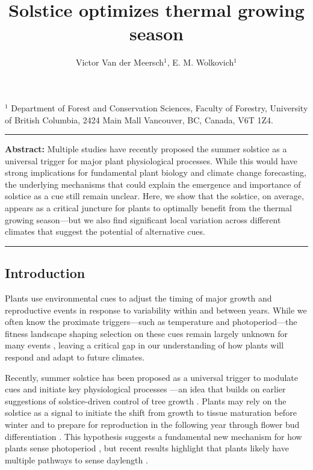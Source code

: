 \documentclass[11pt,letter]{article}
\begin{document}
\title{Solstice optimizes thermal growing season}

\author{Victor Van der Meersch$^{1}$, E. M. Wolkovich$^{1}$}
\date{}
\maketitle 

$^1$ Department of Forest and Conservation Sciences, Faculty of Forestry, University of British Columbia, 2424 Main Mall
Vancouver, BC, Canada, V6T 1Z4. \\

\noindent\rule{\textwidth}{0.3pt}
\textbf{Abstract:} Multiple studies have recently proposed the summer solstice as a universal trigger for major plant physiological processes. While this would have strong implications for fundamental plant biology and climate change forecasting, the underlying mechanisms that could explain the emergence and importance of solstice as a cue still remain unclear. Here, we show that the solstice, on average, appears as a critical juncture for plants to optimally benefit from the thermal growing season---but we also find significant local variation across different climates that suggest the potential of alternative cues. %

\noindent\rule{\textwidth}{0.3pt}

\vspace{0.3cm}

\linenumbers

\subsection*{Introduction}

Plants use environmental cues to adjust the timing of major growth and reproductive events in response to variability within and between years. While we often know the proximate triggers---such as temperature and photoperiod---the fitness landscape shaping selection on these cues remain largely unknown for many events \citep{Chuine2017}, leaving a critical gap in our understanding of how plants will respond and adapt to future climates.

Recently, summer solstice has been proposed as a universal trigger to modulate cues and initiate key physiological processes \citep{Zohner2023, Journe2024}---an idea that builds on earlier suggestions of solstice-driven control of tree growth \citep{Rossi2006}. 
Plants may rely on the solstice as a signal to initiate the shift from growth to tissue maturation before winter and to prepare for reproduction in the following year through flower bud differentiation \citep{Rossi2006, Zohner2023, Journe2024}. This hypothesis suggests a fundamental new mechanism for how plants sense photoperiod \citep{Gendron2023}, but recent results highlight that plants likely have multiple pathways to sense daylength  \citep{wang2024plants}.
\end{document}
